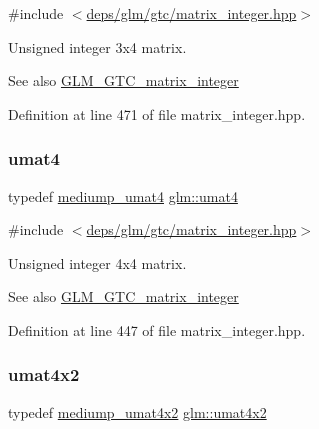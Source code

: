 {\ttfamily \#include $<$\hyperlink{matrix__integer_8hpp}{deps/glm/gtc/matrix\+\_\+integer.\+hpp}$>$}

Unsigned integer 3x4 matrix. \begin{DoxySeeAlso}{See also}
\hyperlink{group__gtc__matrix__integer}{G\+L\+M\+\_\+\+G\+T\+C\+\_\+matrix\+\_\+integer} 
\end{DoxySeeAlso}


Definition at line 471 of file matrix\+\_\+integer.\+hpp.

\mbox{\label{group__gtc__matrix__integer_ga7ae562000d8a8d193e9f93cf51e2e113}} 
\subsubsection{\texorpdfstring{umat4}{umat4}}
{\footnotesize\ttfamily typedef \hyperlink{group__gtc__matrix__integer_ga0653e9571754f1e33203290aaf3dfc5d}{mediump\+\_\+umat4} \hyperlink{group__gtc__matrix__integer_ga7ae562000d8a8d193e9f93cf51e2e113}{glm\+::umat4}}



{\ttfamily \#include $<$\hyperlink{matrix__integer_8hpp}{deps/glm/gtc/matrix\+\_\+integer.\+hpp}$>$}

Unsigned integer 4x4 matrix. \begin{DoxySeeAlso}{See also}
\hyperlink{group__gtc__matrix__integer}{G\+L\+M\+\_\+\+G\+T\+C\+\_\+matrix\+\_\+integer} 
\end{DoxySeeAlso}


Definition at line 447 of file matrix\+\_\+integer.\+hpp.

\mbox{\label{group__gtc__matrix__integer_ga13e8392218e9b6e1b7f194a21b5c88bf}} 
\subsubsection{\texorpdfstring{umat4x2}{umat4x2}}
{\footnotesize\ttfamily typedef \hyperlink{group__gtc__matrix__integer_gaf44e145efd637df6f2a300f968ebb51f}{mediump\+\_\+umat4x2} \hyperlink{group__gtc__matrix__integer_ga13e8392218e9b6e1b7f194a21b5c88bf}{glm\+::umat4x2}}



